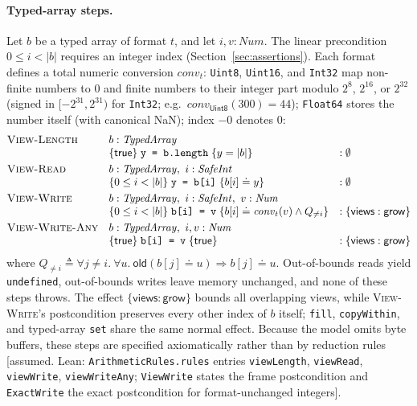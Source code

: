 \documentclass[10pt,a4paper]{article}
\theoremstyle{definition}
\theoremstyle{remark}
\newcommand{\kw}[1]{\mathsf{#1}}
\newcommand{\grow}{\kw{grow}}
\newcommand{\vw}{\kw{views}}
\newcommand{\old}{\kw{old}}
\newcommand{\len}[1]{|#1|}
\newcommand{\hoare}[3]{\{#1\}\;#2\;\{#3\}}
\newcommand{\code}[1]{\texttt{#1}}
\newcommand{\lean}[1]{\texttt{\small #1}}
\newcommand{\status}[1]{\textsf{\small[#1]}}
\begin{document}
\paragraph{Typed-array steps.}
Let $b$ be a typed array of format $t$, and let $i,v:\mathit{Num}$. The
linear precondition $0\le i<\len b$ requires an integer index
(Section~\ref{sec:assertions}). Each format defines a total numeric
conversion $\mathit{conv}_t$: \code{Uint8}, \code{Uint16}, and
\code{Int32} map non-finite numbers to $0$ and finite numbers to their
integer part modulo $2^{8}$, $2^{16}$, or $2^{32}$ (signed in
$[-2^{31},2^{31})$ for \code{Int32}; e.g.\
$\mathit{conv}_{\mathsf{Uint8}}(300)=44$); \code{Float64} stores the
number itself (with canonical NaN); index $-0$ denotes $0$:
{\small\begin{displaymath}
\begin{array}{@{}lll@{}}
\textsc{View-Length} & b:\mathit{TypedArray} & \\
 & \hoare{\kw{true}}{\code{y = b.length}}{y=\len b} & :\emptyset\\[3pt]
\textsc{View-Read} & b:\mathit{TypedArray},\ i:\mathit{SafeInt} & \\
 & \hoare{0\le i<\len b}{\code{y = b[i]}}{b[i]\doteq y} & :\emptyset\\[3pt]
\textsc{View-Write} & b:\mathit{TypedArray},\ i:\mathit{SafeInt},\ v:\mathit{Num} & \\
 & \hoare{0\le i<\len b}{\code{b[i] = v}}{b[i]\doteq\mathit{conv}_t(v)\wedge Q_{\ne i}} & :\{\vw:\grow\}\\[3pt]
\textsc{View-Write-Any} & b:\mathit{TypedArray},\ i,v:\mathit{Num} & \\
 & \hoare{\kw{true}}{\code{b[i] = v}}{\kw{true}} & :\{\vw:\grow\}
\end{array}
\end{displaymath}}
where $Q_{\ne i}\triangleq\forall j\ne i.\ \forall u.\ \old(b[j]\doteq u)\Rightarrow b[j]\doteq u$.
Out-of-bounds reads yield \code{undefined}, out-of-bounds writes leave
memory unchanged, and none of these steps throws. The effect
$\{\vw:\grow\}$ bounds all overlapping views, while \textsc{View-Write}'s
postcondition preserves every other index of $b$ itself; \code{fill},
\code{copyWithin}, and typed-array \code{set} share the same normal
effect. Because the model omits byte buffers, these steps are specified
axiomatically rather than by reduction rules
\status{assumed. Lean: \lean{ArithmeticRules.rules} entries \lean{viewLength}, \lean{viewRead}, \lean{viewWrite}, \lean{viewWriteAny}; \lean{ViewWrite} states the frame postcondition and \lean{ExactWrite} the exact postcondition for format-unchanged integers}.
\end{document}

